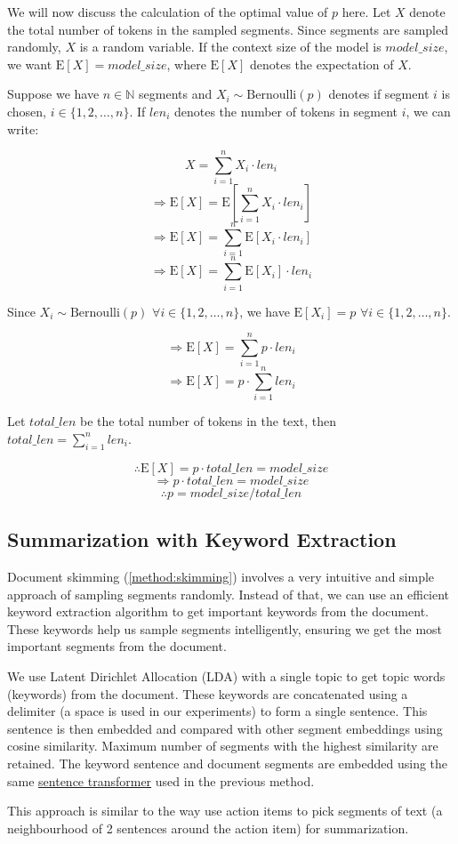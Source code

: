 		We will now discuss the calculation of the optimal value of $p$ here.
		Let $X$ denote the total number of tokens in the sampled segments.
		Since segments are sampled randomly, $X$ is a random variable.
		If the context size of the model is $model\_size$, we want $\mathrm{E}[X] = model\_size$,
		where $\mathrm{E}[X]$ denotes the expectation of $X$.

		Suppose we have $n \in \mathbb{N}$ segments and $X_i \sim \mathrm{Bernoulli}(p)$ denotes
		if segment $i$ is chosen, $i \in \{1, 2, \dots, n\}$.
		If $len_i$ denotes the number of tokens in segment $i$, we can write:

		\[ X = \sum_{i = 1}^{n} X_i \cdot len_i \]
		\[ \Rightarrow \mathrm{E}[X] = \mathrm{E}[\sum_{i = 1}^{n} X_i \cdot len_i] \]
		\[ \Rightarrow \mathrm{E}[X] = \sum_{i = 1}^{n} \mathrm{E}[X_i \cdot len_i] \]
		\[ \Rightarrow \mathrm{E}[X] = \sum_{i = 1}^{n} \mathrm{E}[X_i] \cdot len_i \]

		Since $X_i \sim \mathrm{Bernoulli}(p)$ $\forall i \in \{1, 2, \dots, n\}$, we
		have $\mathrm{E}[X_i] = p$ $\forall i \in \{1, 2, \dots, n\}$.

		\[ \Rightarrow \mathrm{E}[X] = \sum_{i = 1}^{n} p \cdot len_i \]
		\[ \Rightarrow \mathrm{E}[X] = p \cdot \sum_{i = 1}^{n} len_i \]

		Let $total\_len$ be the total number of tokens in the text, then
		$total\_len = \sum_{i = 1}^{n} len_i$.

		\[ \therefore \mathrm{E}[X] = p \cdot total\_len = model\_size \]
		\[ \Rightarrow p \cdot total\_len = model\_size \]
		\[ \therefore p = model\_size / total\_len \]


	\subsection{Summarization with Keyword Extraction}
		\label{method:keyword}

		Document skimming (\ref{method:skimming}) involves a very intuitive and simple approach of
		sampling segments randomly.
		Instead of that, we can use an efficient keyword extraction algorithm to get important keywords
		from the document.
		These keywords help us sample segments intelligently, ensuring we get the most important
		segments from the document.

		We use Latent Dirichlet Allocation (LDA) \cite{blei2003latent} with a single topic to get topic
		words (keywords) from the document.
		These keywords are concatenated using a delimiter (a space is used in our experiments) to form a
		single sentence.
		This sentence is then embedded and compared with other segment embeddings using cosine similarity.
		Maximum number of segments with the highest similarity are retained.
		The keyword sentence and document segments are embedded using the same
		\href{https://huggingface.co/sentence-transformers/all-MiniLM-L6-v2}{sentence transformer}
		used in the previous method.

		This approach is similar to the way \citet{golia2024action} use action items to pick segments
		of text (a neighbourhood of 2 sentences around the action item) for summarization.
